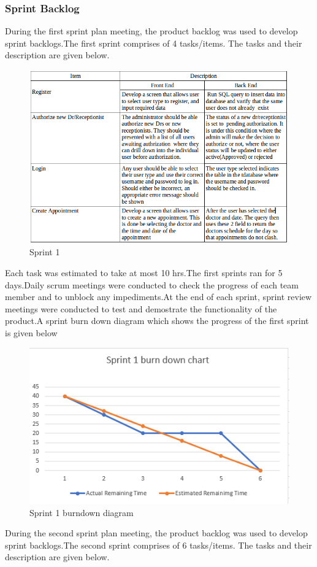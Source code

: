 \documentclass[11 pt]{article}
\begin{document}
  \subsubsection{Sprint Backlog}
During the first sprint plan meeting, the product backlog was used to develop sprint backlogs.The first sprint comprises of 4 tasks/items. The tasks and their description are given below.
\begin{figure}[h]
    \centering
    \includegraphics[width=\linewidth]{final.png}
    \caption{Sprint 1}
    \label{fig:ERD}
    \end{figure}

\newpage
Each task was estimated to take at most 10 hrs.The first sprints ran for 5 days.Daily scrum meetings were conducted to check the progress of each team member and to unblock any impediments.At the end of each sprint,  sprint review meetings were conducted to test and demostrate the functionality of the product.A sprint burn down diagram which shows the progress of the first sprint is given below 
\begin{figure}[h]
    \centering
    \includegraphics[width=\linewidth]{sprint1.PNG}
    \caption{Sprint 1 burndown diagram}
    \label{fig:ERD}
\end{figure}
    \newpage
During the second sprint plan meeting, the product backlog was used to develop sprint backlogs.The second sprint comprises of  6 tasks/items. The tasks and their description are given below.
\end{document}

